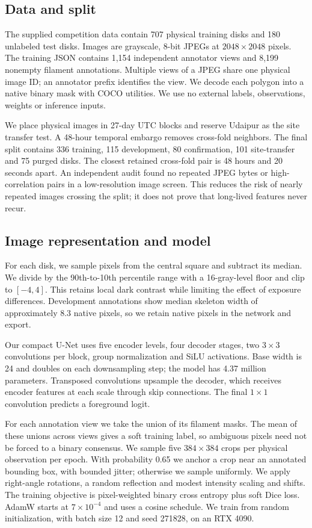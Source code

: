 \subsection{Data and split}
The supplied competition data contain 707 physical training disks and 180 unlabeled test disks. Images are grayscale, 8-bit JPEGs at \(2048\times2048\) pixels. The training JSON contains 1,154 independent annotator views and 8,199 nonempty filament annotations. Multiple views of a JPEG share one physical image ID; an annotator prefix identifies the view. We decode each polygon into a native binary mask with COCO utilities. We use no external labels, observations, weights or inference inputs.

We place physical images in 27-day UTC blocks and reserve Udaipur as the site transfer test. A 48-hour temporal embargo removes cross-fold neighbors. The final split contains 336 training, 115 development, 80 confirmation, 101 site-transfer and 75 purged disks. The closest retained cross-fold pair is 48 hours and 20 seconds apart. An independent audit found no repeated JPEG bytes or high-correlation pairs in a low-resolution image screen. This reduces the risk of nearly repeated images crossing the split; it does not prove that long-lived features never recur.

\subsection{Image representation and model}
For each disk, we sample pixels from the central square and subtract its median. We divide by the 90th-to-10th percentile range with a 16-gray-level floor and clip to \([-4,4]\). This retains local dark contrast while limiting the effect of exposure differences. Development annotations show median skeleton width of approximately 8.3 native pixels, so we retain native pixels in the network and export.

Our compact U-Net \cite{ronneberger2015unet} uses five encoder levels, four decoder stages, two \(3\times3\) convolutions per block, group normalization and SiLU activations. Base width is 24 and doubles on each downsampling step; the model has 4.37 million parameters. Transposed convolutions upsample the decoder, which receives encoder features at each scale through skip connections. The final \(1\times1\) convolution predicts a foreground logit.

For each annotation view we take the union of its filament masks. The mean of these unions across views gives a soft training label, so ambiguous pixels need not be forced to a binary consensus. We sample five \(384\times384\) crops per physical observation per epoch. With probability 0.65 we anchor a crop near an annotated bounding box, with bounded jitter; otherwise we sample uniformly. We apply right-angle rotations, a random reflection and modest intensity scaling and shifts. The training objective is pixel-weighted binary cross entropy plus soft Dice loss. AdamW starts at \(7\times10^{-4}\) and uses a cosine schedule. We train from random initialization, with batch size 12 and seed 271828, on an RTX 4090.


